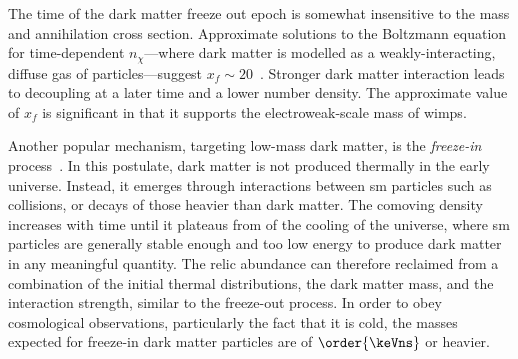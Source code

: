 The time of the dark matter freeze out epoch is somewhat insensitive to the mass and annihilation cross section. Approximate solutions to the Boltzmann equation for time-dependent $n_{\chi}$---where dark matter is modelled as a weakly-interacting, diffuse gas of particles---suggest $x_f \sim 20$~\cite{Lisanti:2016jxe,Bender:2012gc}. Stronger dark matter interaction leads to decoupling at a later time and a lower number density. The approximate value of $x_f$ is significant in that it supports the electroweak-scale mass of \glspl{wimp}.

Another popular mechanism, targeting low-mass dark matter, is the \emph{freeze-in} process~\cite{Hall:2009bx,Krnjaic:2017tio}. In this postulate, dark matter is not produced thermally in the early universe. Instead, it emerges through interactions between \acrshort{sm} particles such as collisions, or decays of those heavier than dark matter. The comoving density increases with time until it plateaus from of the cooling of the universe, where \acrshort{sm} particles are generally stable enough and too low energy to produce dark matter in any meaningful quantity. The relic abundance can therefore reclaimed from a combination of the initial thermal distributions, the dark matter mass, and the interaction strength, similar to the freeze-out process. In order to obey cosmological observations, particularly the fact that it is cold, the masses expected for freeze-in dark matter particles are of $\order{\keVns}$ or heavier.

\iffalse

